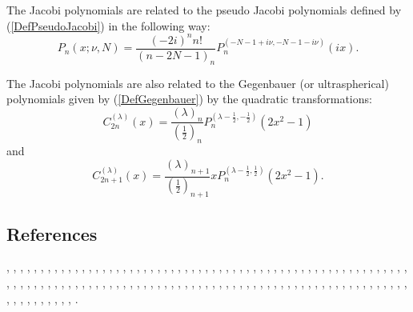 \documentclass[envcountchap,graybox]{svmono}
\begin{document}
\noindent
The Jacobi polynomials are related to the pseudo Jacobi polynomials defined by
(\ref{DefPseudoJacobi}) in the following way:
$$P_n(x;\nu,N)=\frac{(-2i)^nn!}{(n-2N-1)_n}P_n^{(-N-1+i\nu,-N-1-i\nu)}(ix).$$

\noindent
The Jacobi polynomials are also related to the Gegenbauer (or ultraspherical) polynomials
given by (\ref{DefGegenbauer}) by the quadratic transformations:
$$C_{2n}^{(\lambda)}(x)=\frac{(\lambda)_n}{(\frac{1}{2})_n}
P_n^{(\lambda-\frac{1}{2},-\frac{1}{2})}(2x^2-1)$$
and
$$C_{2n+1}^{(\lambda)}(x)=\frac{(\lambda)_{n+1}}{(\frac{1}{2})_{n+1}}
xP_n^{(\lambda-\frac{1}{2},\frac{1}{2})}(2x^2-1).$$

\subsection*{References}
\cite{Abram}, \cite{Ahmed+82}, \cite{Allaway89}, \cite{NAlSalam66}, \cite{AlSalam64}, 
\cite{AlSalamChihara72}, \cite{AndrewsAskey85}, \cite{AndrewsAskeyRoy}, \cite{Askey68}, 
\cite{Askey70}, \cite{Askey72}, \cite{Askey73}, \cite{Askey74}, \cite{Askey75}, \cite{Askey78}, 
\cite{Askey89I}, \cite{Askey2005}, \cite{AskeyFitch}, \cite{AskeyGasper71I}, \cite{AskeyGasper71II}, 
\cite{AskeyGasper76}, \cite{AskeyWainger}, \cite{AskeyWilson85}, \cite{Bailey38}, \cite{Brafman51}, 
\cite{Brown}, \cite{Carlitz61II}, \cite{Carlitz67}, \cite{ChenIsmail91}, \cite{Chihara78}, 
\cite{Chow+}, \cite{Ciesielski}, \cite{Cooper+}, \cite{DetteStudden92}, \cite{DetteStudden95},
\cite{DijksmaKoorn}, \cite{DimitrovRafaeli}, \cite{DimitrovRodrigues}, \cite{Doha2002I},
\cite{Doha2003I}, \cite{Doha2004II}, \cite{Dunkl84}, \cite{ElbertLaforgia87II},
\cite{ElbertLaforgiaRodono}, \cite{Erdelyi+}, \cite{Faldey}, \cite{FoataLeroux},
\cite{Gasper69}, \cite{Gasper70I}, \cite{Gasper70II}, \cite{Gasper71I}, \cite{Gasper71II},
\cite{Gasper72I}, \cite{Gasper72II}, \cite{Gasper73I}, \cite{Gasper73II}, \cite{Gasper74},
\cite{Gasper77}, \cite{Gatteschi87}, \cite{Gautschi2008}, \cite{Gautschi2009I},
\cite{Gautschi2009II}, \cite{GautschiLeopardi}, \cite{GawronskiShawyer}, \cite{Godoy+},
\cite{Grad}, \cite{Hajmirzaahmad94}, \cite{HartmannStephan}, \cite{Horton}, \cite{Ismail74},
\cite{Ismail77}, \cite{Ismail96}, \cite{Ismail2005II}, \cite{IsmailLi},
\cite{IsmailMassonRahman}, \cite{Kochneff97I}, \cite{Koekoek99}, \cite{Koekoek2000},
\cite{Koelink96II}, \cite{Koorn73}, \cite{Koorn74}, \cite{Koorn75}, \cite{Koorn77II},
\cite{Koorn78}, \cite{Koorn72}, \cite{Koorn85}, \cite{Koorn88}, \cite{KuijlaarsMartinez},
\cite{Kuijlaars+}, \cite{LabelleYehI}, \cite{LabelleYehII}, \cite{Laine}, \cite{Lesky95II},
\cite{Lesky96}, \cite{Li96}, \cite{Li97}, \cite{LopezTemme2004}, \cite{Luke}, \cite{Martinez},
\cite{Mathai}, \cite{Meijer}, \cite{Miller89}, \cite{MoakSaffVarga}, \cite{Nikiforov+},
\cite{NikiforovUvarov}, \cite{Olver}, \cite{Prasad}, \cite{Rahman76I}, \cite{Rahman76II},
\cite{Rahman77}, \cite{Rahman81I}, \cite{RahmanShah}, \cite{Rainville}, \cite{Rusev},
\cite{Shi}, \cite{Srivastava69II}, \cite{Srivastava71}, \cite{Srivastava82},
\cite{SrivastavaSinghal}, \cite{Stanton80I}, \cite{Stanton90}, \cite{Szego75}, \cite{Temme},
\cite{Vertesi}, \cite{Wimp87}, \cite{WongZhang94}, \cite{WongZhang2006}, \cite{Zarzo+},
\cite{Zayed}.
\end{document}
